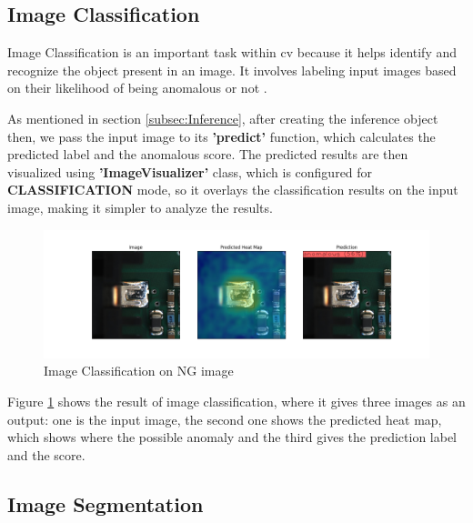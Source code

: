 \subsection{Image Classification}
\label{subsec:Image Classification}

Image Classification is an important task within \gls{cv} because it helps identify and recognize the object present in an image. It involves labeling input images based on their likelihood of being anomalous or not \cite{FANG2020100980}.

As mentioned in section \ref{subsec:Inference}, after creating the inference object then, we pass the input image to its \textbf{'predict'} function, which calculates the predicted label and the anomalous score. The predicted results are then visualized using \textbf{'ImageVisualizer'} class, which is configured for \textbf{CLASSIFICATION} mode, so it overlays the classification results on the input image, making it simpler to analyze the results.

\begin{figure}[ht!]
    \centering
    \includegraphics[width=1\linewidth]{Images/anomalous_image_classification.jpg}
    \caption{Image Classification on NG image}
    \label{fig:Image classification on NG image}
\end{figure}

Figure \ref{fig:Image classification on NG image} shows the result of image classification, where it gives three images as an output: one is the input image, the second one shows the predicted heat map, which shows where the possible anomaly and the third gives the prediction label and the score.

\subsection{Image Segmentation}

